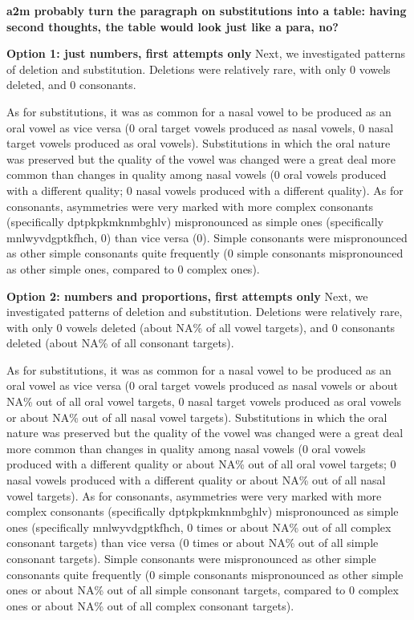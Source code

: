\documentclass[english,,man,floatsintext]{apa6}
\begin{document}
\textbf{a2m probably turn the paragraph on substitutions into a table:
having second thoughts, the table would look just like a para, no?}

\textbf{Option 1: just numbers, first attempts only } Next, we
investigated patterns of deletion and substitution. Deletions were
relatively rare, with only 0 vowels deleted, and 0 consonants.

As for substitutions, it was as common for a nasal vowel to be produced
as an oral vowel as vice versa (0 oral target vowels produced as nasal
vowels, 0 nasal target vowels produced as oral vowels). Substitutions in
which the oral nature was preserved but the quality of the vowel was
changed were a great deal more common than changes in quality among
nasal vowels (0 oral vowels produced with a different quality; 0 nasal
vowels produced with a different quality). As for consonants,
asymmetries were very marked with more complex consonants (specifically
dptpkpkmknmbghlv) mispronounced as simple ones (specifically
mnlwyvdgptkfhch, 0) than vice versa (0). Simple consonants were
mispronounced as other simple consonants quite frequently (0 simple
consonants mispronounced as other simple ones, compared to 0 complex
ones).

\textbf{Option 2: numbers and proportions, first attempts only} Next, we
investigated patterns of deletion and substitution. Deletions were
relatively rare, with only 0 vowels deleted (about NA\% of all vowel
targets), and 0 consonants deleted (about NA\% of all consonant
targets).

As for substitutions, it was as common for a nasal vowel to be produced
as an oral vowel as vice versa (0 oral target vowels produced as nasal
vowels or about NA\% out of all oral vowel targets, 0 nasal target
vowels produced as oral vowels or about NA\% out of all nasal vowel
targets). Substitutions in which the oral nature was preserved but the
quality of the vowel was changed were a great deal more common than
changes in quality among nasal vowels (0 oral vowels produced with a
different quality or about NA\% out of all oral vowel targets; 0 nasal
vowels produced with a different quality or about NA\% out of all nasal
vowel targets). As for consonants, asymmetries were very marked with
more complex consonants (specifically dptpkpkmknmbghlv) mispronounced as
simple ones (specifically mnlwyvdgptkfhch, 0 times or about NA\% out of
all complex consonant targets) than vice versa (0 times or about NA\%
out of all simple consonant targets). Simple consonants were
mispronounced as other simple consonants quite frequently (0 simple
consonants mispronounced as other simple ones or about NA\% out of all
simple consonant targets, compared to 0 complex ones or about NA\% out
of all complex consonant targets).
\end{document}
